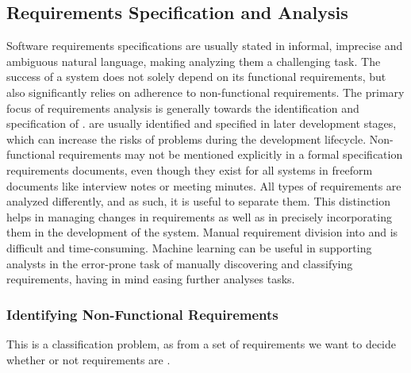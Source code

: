 \subsection{Requirements Specification and Analysis}

Software requirements specifications are usually stated in informal, imprecise
and ambiguous natural language, making analyzing them a challenging task.
The success of a system does not solely depend on its functional requirements,
but also significantly relies on adherence to non-functional requirements.
The primary focus of requirements analysis is generally towards the
identification and specification of \FRs. \NFRs are usually identified and
specified in later development stages, which can increase the risks of problems
during the development lifecycle. Non-functional requirements may not be
mentioned explicitly in a formal specification requirements documents, even
though they exist for all systems in freeform documents like interview notes or
meeting minutes. All types of requirements are analyzed differently, and as
such, it is useful to separate them. This distinction helps in managing changes in requirements as
well as in precisely incorporating them in the development of the system. Manual
requirement division into \FRs and \NFRs is difficult and time-consuming.
Machine learning can be useful in supporting analysts in the error-prone task of
manually discovering and classifying requirements, having in mind
easing further analyses tasks.

\subsubsection{Identifying Non-Functional Requirements}
This is a classification problem, as from a set of requirements we want to
decide whether or not requirements are \NFRs. 

